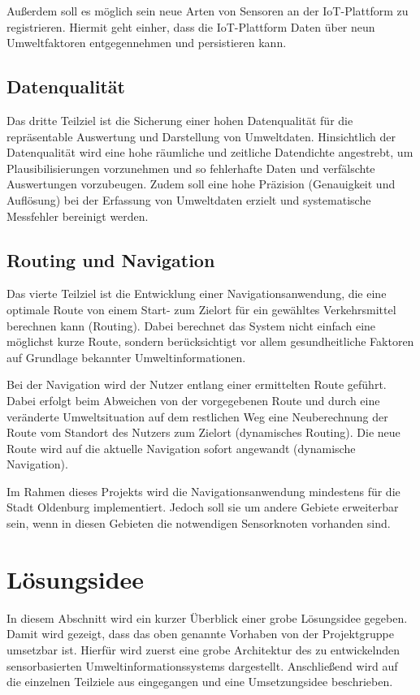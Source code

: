 Außerdem soll es möglich sein neue Arten von Sensoren an der IoT-Plattform zu registrieren. Hiermit geht einher, dass die IoT-Plattform Daten über neun Umweltfaktoren entgegennehmen und persistieren kann.

\subsection{Datenqualität}
\label{sec:Datenqualitaet}
Das dritte Teilziel ist die Sicherung einer hohen Datenqualität für die repräsentable Auswertung und Darstellung von Umweltdaten. Hinsichtlich der Datenqualität wird eine hohe räumliche und zeitliche Datendichte angestrebt, um Plausibilisierungen vorzunehmen und so fehlerhafte Daten und verfälschte Auswertungen vorzubeugen. Zudem soll eine hohe Präzision (Genauigkeit und Auflösung) bei der Erfassung von Umweltdaten erzielt und systematische Messfehler bereinigt werden.

\subsection{Routing und Navigation}
\label{sec:Routing_und_Navigation}
Das vierte Teilziel ist die Entwicklung einer Navigationsanwendung, die eine optimale Route von einem Start- zum Zielort für ein gewähltes Verkehrsmittel berechnen kann (Routing). Dabei berechnet das System nicht einfach eine möglichst kurze Route, sondern berücksichtigt vor allem gesundheitliche Faktoren auf Grundlage bekannter Umweltinformationen.

Bei der Navigation wird der Nutzer entlang einer ermittelten Route geführt. Dabei erfolgt beim Abweichen von der vorgegebenen Route und durch eine veränderte Umweltsituation auf dem restlichen Weg eine Neuberechnung der Route vom Standort des Nutzers zum Zielort (dynamisches Routing). Die neue Route wird auf die aktuelle Navigation sofort angewandt (dynamische Navigation).

Im Rahmen dieses Projekts wird die Navigationsanwendung mindestens für die Stadt Oldenburg implementiert. Jedoch soll sie um andere Gebiete erweiterbar sein, wenn in diesen Gebieten die notwendigen Sensorknoten vorhanden sind.

\section{Lösungsidee}
\label{sec:Loesungsidee}
In diesem Abschnitt wird ein kurzer Überblick einer grobe Lösungsidee gegeben. Damit wird gezeigt, dass das oben genannte Vorhaben von der Projektgruppe umsetzbar ist. Hierfür wird zuerst eine grobe Architektur des zu entwickelnden sensorbasierten Umweltinformationssystems dargestellt. Anschließend wird auf die einzelnen Teilziele aus  eingegangen und eine Umsetzungsidee beschrieben.

